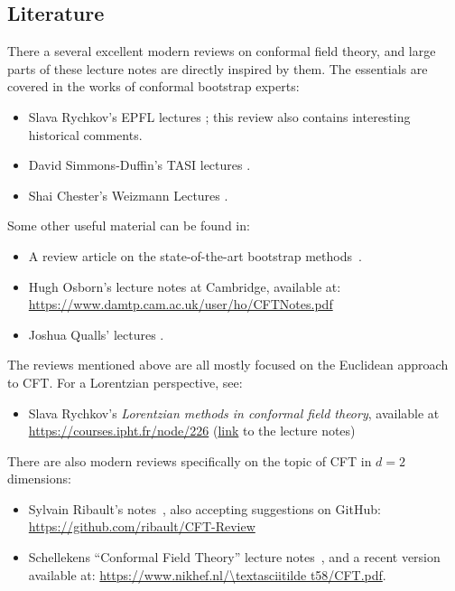 \documentclass[a4paper,12pt]{article}
\numberwithin{equation}{section}
\begin{document}
\subsection{Literature}

There a several excellent modern reviews on conformal field theory, and large parts of these lecture notes are directly inspired by them.
The essentials are covered in the works of conformal bootstrap experts:
\begin{itemize}

\item
Slava Rychkov's EPFL lectures
\cite{Rychkov:2016iqz};
this review also contains interesting historical comments.

\item
David Simmons-Duffin's TASI lectures
\cite{Simmons-Duffin:2016gjk}.

\item
Shai Chester's Weizmann Lectures
\cite{Chester:2019wfx}.

\end{itemize}
%
Some other useful material can be found in:
%
\begin{itemize}

\item
A review article on the state-of-the-art bootstrap methods~\cite{Poland:2018epd}.

\item
Hugh Osborn's lecture notes at Cambridge, available at: \\ 
\url{https://www.damtp.cam.ac.uk/user/ho/CFTNotes.pdf}

\item
Joshua Qualls' lectures \cite{Qualls:2015qjb}.

\end{itemize}
%
The reviews mentioned above are all mostly focused on the Euclidean approach to CFT. For a Lorentzian perspective, see:
\begin{itemize}

\item
Slava Rychkov's \emph{Lorentzian methods in conformal field theory}, available at \url{https://courses.ipht.fr/node/226}
(\href{https://www.ipht.fr/Docspht/articles/t19/229/public/Lecture-notes-Rychkov-IPHT.pdf}{link} to the lecture notes)

\end{itemize}
%
There are also modern reviews specifically on the topic of CFT in $d = 2$ dimensions:
\begin{itemize}

\item
Sylvain Ribault's notes~\cite{Ribault:2014hia}, 
also accepting suggestions on GitHub: \\ 
\url{https://github.com/ribault/CFT-Review}

\item
Schellekens ``Conformal Field Theory'' lecture notes~\cite{Schellekens:1996tg}, and a recent version available at:
\url{https://www.nikhef.nl/\textasciitilde t58/CFT.pdf}.

\end{itemize}
\end{document}

